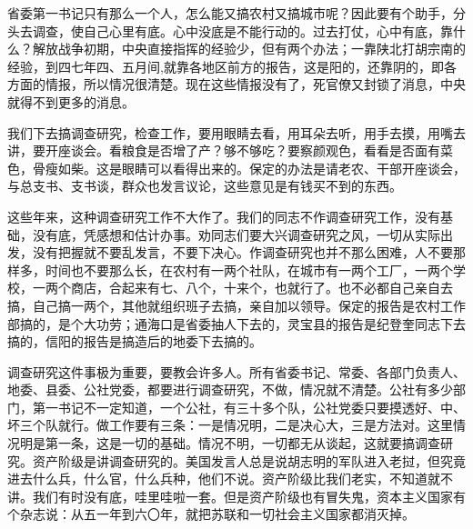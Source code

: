 省委第一书记只有那么一个人，怎么能又搞农村又搞城市呢？因此要有个助手，分头去调查，使自己心里有底。心中没底是不能行动的。过去打仗，心中有底，靠什么？解放战争初期，中央直接指挥的经验少，但有两个办法；一靠陕北打胡宗南的经验，到四七年四、五月间,就靠各地区前方的报告，这是阳的，还靠阴的，即各方面的情报，所以情况很清楚。现在这些情报没有了，死官僚又封锁了消息，中央就得不到更多的消息。

我们下去搞调查研究，检查工作，要用眼睛去看，用耳朵去听，用手去摸，用嘴去讲，要开座谈会。看粮食是否增了产？够不够吃？要察颜观色，看看是否面有菜色，骨瘦如柴。这是眼睛可以看得出来的。保定的办法是请老农、干部开座谈会，与总支书、支书谈，群众也发言议论，这些意见是有钱买不到的东西。

这些年来，这种调查研究工作不大作了。我们的同志不作调查研究工作，没有基础，没有底，凭感想和估计办事。劝同志们要大兴调查研究之风，一切从实际出发，没有把握就不要乱发言，不要下决心。作调查研究也并不那么困难，人不要那样多，时间也不要那么长，在农村有一两个社队，在城市有一两个工厂，一两个学校，一两个商店，合起来有七、八个，十来个，也就行了。也不必都自己亲自去搞，自己搞一两个，其他就组织班子去搞，亲自加以领导。保定的报告是农村工作部搞的，是个大功劳；通海口是省委抽人下去的，灵宝县的报告是纪登奎同志下去搞的，信阳的报告是搞造后的地委下去搞的。

调查研究这件事极为重要，要教会许多人。所有省委书记、常委、各部门负责人、地委、县委、公社党委，都要进行调查研究，不做，情况就不清楚。公社有多少部门，第一书记不一定知道，一个公社，有三十多个队，公社党委只要摸透好、中、坏三个队就行。做工作要有三条：一是情况明，二是决心大，三是方法对。这里情况明是第一条，这是一切的基础。情况不明，一切都无从谈起，这就要搞调查研究。资产阶级是讲调查研究的。美国发言人总是说胡志明的军队进入老挝，但究竟进去什么兵，什么官，什么兵种，他们不说。资产阶级比我们老实，不知道就不讲。我们有时没有底，哇里哇啦一套。但是资产阶级也有冒失鬼，资本主义国家有个杂志说：从五一年到六〇年，就把苏联和一切社会主义国家都消灭掉。

